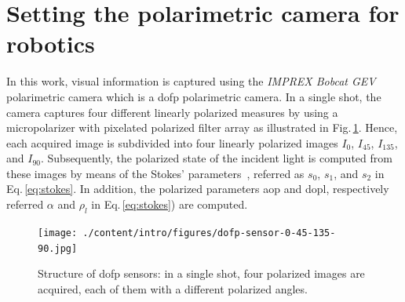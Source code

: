 \graphicspath{{./content/intro/figures/}}
\section{Setting the polarimetric camera for robotics}
\label{sec:rosify}

In this work, visual information is captured using the \emph{IMPREX Bobcat GEV}
polarimetric camera which is a \gls{dofp} polarimetric camera. In a single shot,
the camera captures four different linearly polarized measures by using
a micropolarizer with pixelated polarized filter array as illustrated in
Fig.\,\ref{fig:dofp-sensor}. Hence, each acquired image is subdivided into four
linearly polarized images $I_0$, $I_{45}$, $I_{135}$, and
$I_{90}$. Subsequently, the polarized state of the incident light is computed
from these images by means of the Stokes'
parameters~\cite{goldstein2017polarized}, referred as $s_0$, $s_1$, and $s_2$
in Eq.\,\ref{eq:stokes}. In addition, the polarized parameters \gls{aop} and
\gls{dopl}, respectively referred $\alpha$ and $\rho_l$ in
Eq.\,\ref{eq:stokes}) are computed.


\begin{figure}
  \centering
  \texttt{[image: ./content/intro/figures/dofp-sensor-0-45-135-90.jpg]}
  \caption{Structure of \gls{dofp} sensors: in a single shot, four polarized
    images are acquired, each of them with a different polarized angles.}
    \label{fig:dofp-sensor}
\end{figure}


